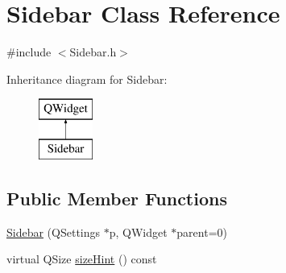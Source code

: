 \hypertarget{class_sidebar}{}\section{Sidebar Class Reference}
\label{class_sidebar}


{\ttfamily \#include $<$Sidebar.\+h$>$}

Inheritance diagram for Sidebar\+:\begin{figure}[H]
\begin{center}
\leavevmode
\includegraphics[height=2.000000cm]{class_sidebar}
\end{center}
\end{figure}
\subsection*{Public Member Functions}
\begin{DoxyCompactItemize}
\item 
\hyperlink{class_sidebar_a10391c9e70310c851112adbc5f01257a}{Sidebar} (Q\+Settings $\ast$p, Q\+Widget $\ast$parent=0)
\item 
virtual Q\+Size \hyperlink{class_sidebar_ad0ad5d51c1d4469fcbec8c79d5992c94}{size\+Hint} () const 
\end{DoxyCompactItemize}
